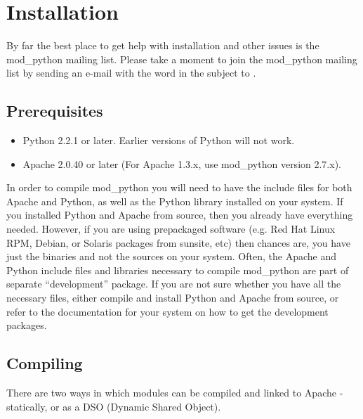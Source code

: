 \chapter{Installation\label{installation}}

\begin{notice}
  By far the best place to get help with installation and other issues
  is the mod_python mailing list. Please take a moment to join the
  mod_python mailing list by sending an e-mail with the word
   in the subject to
  .
\end{notice}

\section{Prerequisites\label{inst-prerequisites}}

\begin{itemize}
\item
  Python 2.2.1 or later. Earlier versions of Python will not work.
\item
  Apache 2.0.40 or later (For Apache 1.3.x, use mod_python version 2.7.x).
\end{itemize}

In order to compile mod_python you will need to have the include files
for both Apache and Python, as well as the Python library installed on
your system.  If you installed Python and Apache from source, then you
already have everything needed. However, if you are using prepackaged
software (e.g. Red Hat Linux RPM, Debian, or Solaris packages from
sunsite, etc) then chances are, you have just the binaries and not the
sources on your system. Often, the Apache and Python include files and
libraries necessary to compile mod_python are part of separate
``development'' package. If you are not sure whether you have all the
necessary files, either compile and install Python and Apache from
source, or refer to the documentation for your system on how to get
the development packages.

\section{Compiling\label{inst-compiling}}

There are two ways in which modules can be compiled and linked to
Apache - statically, or as a DSO (Dynamic Shared Object).

